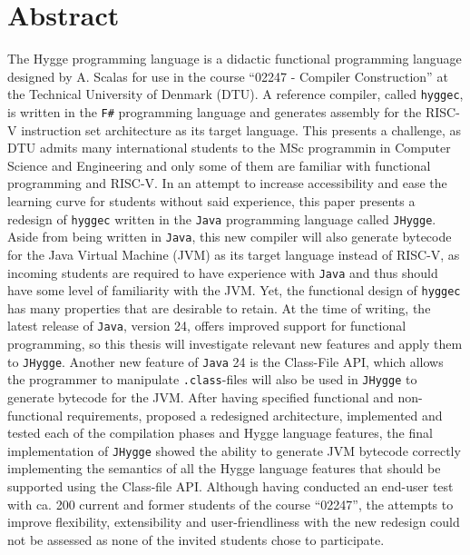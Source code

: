 \section*{Abstract}

The Hygge programming language\cite{lecture_notes} is a didactic functional programming language designed by A. Scalas
for use in the course ``02247 - Compiler Construction''\cite{curriculum_02247} at the Technical University of Denmark (DTU).
A reference compiler, called \texttt{hyggec}\cite{hyggec}, is written in the \texttt{F\#} programming language and
generates assembly for the RISC-V instruction set architecture as its target language. This presents a challenge,
as DTU admits many international students to the MSc programmin in Computer Science and Engineering and only some of them
are familiar with functional programming and RISC-V. In an attempt to increase accessibility and ease the learning curve for students
without said experience, this paper presents a redesign of \texttt{hyggec} written in the \texttt{Java} programming language
called \texttt{JHygge}. Aside from being written in \texttt{Java}, this new compiler will also generate bytecode for
the Java Virtual Machine (JVM) as its target language instead of RISC-V, as incoming students are required to have
experience with \texttt{Java} and thus should have some level of familiarity with the JVM. Yet, the functional design
of \texttt{hyggec} has many properties that are desirable to retain. At the time of writing, the latest release of \texttt{Java},
version 24, offers improved support for functional programming, so this thesis will investigate relevant new features
and apply them to \texttt{JHygge}. Another new feature of \texttt{Java} 24 is the Class-File API\cite{jep484}, which
allows the programmer to manipulate \texttt{.class}-files will also be used in \texttt{JHygge} to generate bytecode
for the JVM. After having specified functional and non-functional requirements, proposed a redesigned architecture,
implemented and tested each of the compilation phases and Hygge language features, the final implementation of \texttt{JHygge}
showed the ability to generate JVM bytecode correctly implementing the semantics of all the Hygge language features
that should be supported using the Class-file API. Although having conducted an end-user test with ca. 200 current and
former students of the course ``02247'', the attempts to improve flexibility, extensibility and user-friendliness with
the new redesign could not be assessed as none of the invited students chose to participate.



